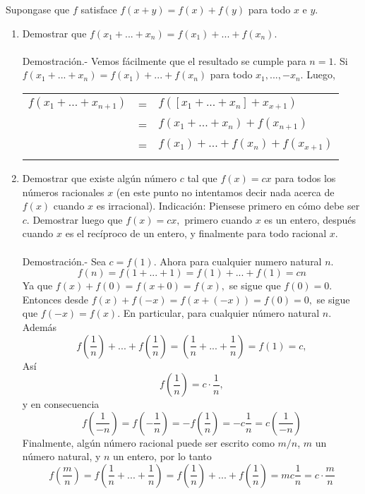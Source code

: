 \begin{teo}
Supongase que $f$ satisface $f(x+y) = f(x) + f(y)$ para todo $x$ \; e \; $y$.
\begin{enumerate}[\bfseries a)]
\item Demostrar que $f(x_1 +...+ x_n) = f(x_1) + ... + f(x_n).$\\\\
Demostración.- \; Vemos fácilmente que el resultado se cumple para $n=1$. Si $f(x_1 + ... + x_n) = f(x_1)+...+f(x_n)$ para todo $x_1,...,-x_n.$ Luego,
\begin{center}
\begin{tabular}{r c l}
$f(x_1 + ... + x_{n+1})$&=&$f\left( [x_1 + ... + x_n] + x_{x+1} \right)$\\
&=&$f(x_1 + ... + x_n) + f(x_{n+1})$\\
&=&$f(x_1) +...+ f(x_n) + f(x_{x+1})$\\\\
\end{tabular}
\end{center}

\item Demostrar que existe algún número $c$ tal que $f(x) = cx$ para todos los números racionales $x$ (en este punto no intentamos decir nada acerca de $f(x)$ cuando $x$ es irracional). Indicación: Piensese primero en cómo debe ser $c.$ Demostrar luego que $f(x) = cx,$ primero cuando $x$ es un entero, después cuando $x$ es el recíproco de un entero, y finalmente para todo racional $x$.\\\\
Demostración.- \; Sea $c = f(1).$ Ahora para cualquier numero natural $n.$ $$f(n) = f(1+...+1) = f(1) + ... + f(1) = cn$$
Ya que $f(x) + f(0) = f(x+0) = f(x),$ se sigue que $f(0) = 0$. Entonces desde $f(x) + f(-x) = f(x + (-x)) = f(0) = 0,$ se sigue que $f(-x) = f(x).$ En particular, para cualquier número natural $n.$ Además $$f \left( \dfrac{1}{n} \right) + ... + f(\dfrac{1}{n}) = \left( \dfrac{1}{n} + ... + \dfrac{1}{n} \right) = f(1) = c,$$
Así $$f\left( \dfrac{1}{n} \right) = c \cdot \dfrac{1}{n},$$
 y en consecuencia $$f\left( \dfrac{1}{-n} \right) = f \left( - \dfrac{1}{n} \right) = -f \left( \dfrac{1}{n} \right) = - c \dfrac{1}{n} = c \left(\dfrac{1}{-n} \right)$$
 Finalmente, algún número racional puede ser escrito como $m/n$,  $m$
 un número natural, y $n$ un entero, por lo tanto $$f\left( \dfrac{m}{n} \right) = f\left( \dfrac{1}{n} + ... + \dfrac{1}{n} \right) = f\left( \dfrac{1}{n} \right) + ... + f\left( \dfrac{1}{n} \right) = mc \dfrac{1}{n} = c \cdot \dfrac{m}{n}$$\\\\
\end{enumerate}
\end{teo}

